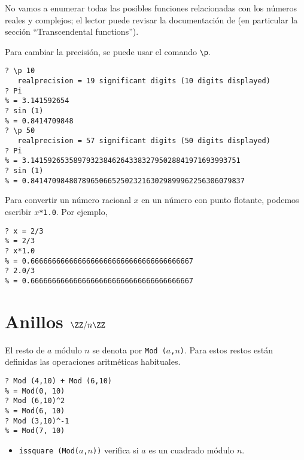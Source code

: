 No vamos a enumerar todas las posibles funciones relacionadas con los números
reales y complejos; el lector puede revisar la documentación de \gp{}
(en particular la sección ``Transcendental functions'').

Para cambiar la precisión, se puede usar el comando \texttt{\textbackslash p}.

\begin{framed}\footnotesize
\begin{verbatim}
? \p 10
   realprecision = 19 significant digits (10 digits displayed)
? Pi
% = 3.141592654
? sin (1)
% = 0.8414709848
? \p 50
   realprecision = 57 significant digits (50 digits displayed)
? Pi
% = 3.1415926535897932384626433832795028841971693993751
? sin (1)
% = 0.84147098480789650665250232163029899962256306079837
\end{verbatim}
\end{framed}

Para convertir un número racional $x$ en un número con punto flotante, podemos
escribir \texttt{$x$*1.0}. Por ejemplo,
\begin{framed}\footnotesize
\begin{verbatim}
? x = 2/3
% = 2/3
? x*1.0
% = 0.66666666666666666666666666666666666667
? 2.0/3
% = 0.66666666666666666666666666666666666667
\end{verbatim}
\end{framed}


\section{Anillos $\ZZ/n\ZZ$}

El resto de $a$ módulo $n$ se denota por \texttt{Mod\,($a$,$n$)}. Para estos
restos están definidas las operaciones aritméticas habituales.

\begin{framed}\footnotesize
\begin{verbatim}
? Mod (4,10) + Mod (6,10)
% = Mod(0, 10)
? Mod (6,10)^2
% = Mod(6, 10)
? Mod (3,10)^-1
% = Mod(7, 10)
\end{verbatim}
\end{framed}

\begin{itemize}
\item \texttt{issquare\,(Mod($a$,$n$))} verifica si $a$ es un cuadrado módulo
  $n$.
\end{itemize}

